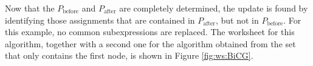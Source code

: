 %
Now that the $P_\text{before}$ and $P_\text{after}$ are completely determined, the update is found by identifying those assignments that are contained in $P_\text{after}$, but not in $P_\text{before}$. For this example, no common subexpressions are replaced. The worksheet for this algorithm, together with a second one for the algorithm obtained from the set that only contains the first node, is shown in Figure \ref{fig:ws:BiCG}.

\begin{figure}
\centering
{}
\end{figure}
